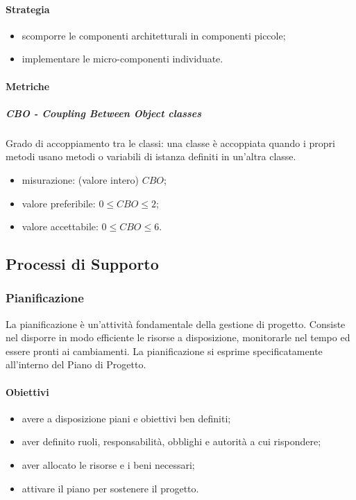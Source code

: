 		\paragraph{Strategia}
		\begin{itemize}
			\item scomporre le componenti architetturali in componenti piccole;
			\item implementare le micro-componenti individuate.
		\end{itemize}
		\paragraph{Metriche}
			\subparagraph{CBO - Coupling Between Object classes} 
			Grado di accoppiamento tra le classi: una classe è accoppiata quando i propri metodi usano metodi o variabili di istanza definiti in un'altra classe. 
			\begin{itemize}
				\item misurazione: (valore intero) $CBO$;
				\item valore preferibile: $0 \leq CBO \leq 2$;
				\item valore accettabile: $0 \leq CBO \leq 6$.
			\end{itemize}
		
\subsection{Processi di Supporto}
	\subsubsection{Pianificazione}
	La pianificazione è un'attività fondamentale della gestione di progetto. Consiste nel disporre in modo efficiente le risorse a disposizione, monitorarle nel tempo ed essere pronti ai cambiamenti. La pianificazione si esprime specificatamente all'interno del Piano di Progetto.
		\paragraph{Obiettivi}
		\begin{itemize}
			\item avere a disposizione piani e obiettivi ben definiti;
			\item aver definito ruoli, responsabilità, obblighi e autorità a cui rispondere;
			\item aver allocato le risorse e i beni necessari;
			\item attivare il piano per sostenere il progetto.
		\end{itemize}	
